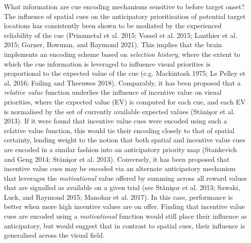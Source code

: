 \documentclass[11pt,halfline,a4paper,]{ouparticle}
\begin{document}
What information are cue encoding mechanisms sensitive to before target onset? The influence of spatial cues on the anticipatory prioritisation of potential target locations has consistently been shown to be mediated by the experienced reliability of the cue (Prinzmetal et al. 2015; Vossel et al. 2015; Lanthier et al. 2015; Garner, Bowman, and Raymond 2021). This implies that the brain implements an encoding scheme based on \emph{selection history}, where the extent to which the cue information is leveraged to influence visual priorities is proportional to the expected value of the cue (e.g. Mackintosh 1975; Le Pelley et al, 2016; Failing and Theeuwes 2018). Comparably, it has been proposed that a \emph{relative value} function underlies the influence of incentive value on visual priorities, where the expected value (EV) is computed for each cue, and each EV is normalised by the set of currently available expected values (Stănişor et al. 2013). If it were found that incentive value cues were encoded using such a relative value function, this would tie their encoding closely to that of spatial certainty, lending weight to the notion that both spatial and incentive value cues are encoded in a similar fashion into an anticipatory priority map (Stankevich and Geng 2014; Stănişor et al. 2013). Conversely, it has been proposed that incentive value cues may be encoded via an alternate anticipatory mechanism that leverages the \emph{motivational} value offered by summing across all reward values that are signalled as available on a given trial (see Stănişor et al. 2013; Sawaki, Luck, and Raymond 2015; Manohar et al. 2017). In this case, performance is better when more high incentive values are on offer. Finding that incentive value cues are encoded using a \emph{motivational} function would still place their influence as anticipatory, but would suggest that in contrast to spatial cues, their influence is generalised across the visual field.
\end{document}
